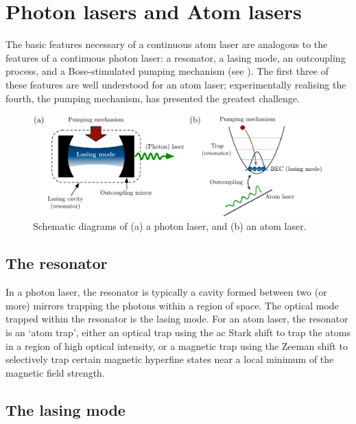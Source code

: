 \section{Photon lasers and Atom lasers}
\label{Introduction:PhotonAndAtomLasers}

The basic features necessary of a continuous atom laser are analogous to the features of a continuous photon laser: a resonator, a lasing mode, an outcoupling process, and a Bose-stimulated pumping mechanism (see ).  The first three of these features are well understood for an atom laser; experimentally realising the fourth, the pumping mechanism, has presented the greatest challenge.

\begin{figure}
    \centering
    \includegraphics[width=14cm]{LaserAtomLaserComparison}
    \caption{
        \label{Introduction:LaserAtomLaserComparison}
        Schematic diagrams of (a) a photon laser, and (b) an atom laser.
    }
\end{figure}

\subsection{The resonator}

In a photon laser, the resonator is typically a cavity formed between two (or more) mirrors trapping the photons within a region of space.  The optical mode trapped within the resonator is the lasing mode.  For an atom laser, the resonator is an `atom trap', either an optical trap using the ac Stark shift to trap the atoms in a region of high optical intensity, or a magnetic trap using the Zeeman shift to selectively trap certain magnetic hyperfine states near a local minimum of the magnetic field strength.

\subsection{The lasing mode}

